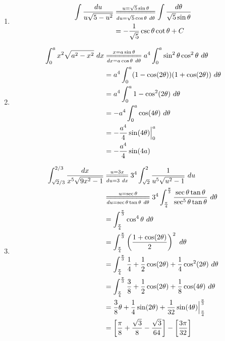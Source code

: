 \documentclass{article}
\begin{document}
\begin{enumerate}[label={\bf{}\arabic*}.]
\item%
	\begin{align*}
	\int\frac{du}{u\sqrt{5-u^2}}&\overset{u=\sqrt{5}\sin\theta}{\underset{du=\sqrt{5}\cos\theta\ d\theta}{=\joinrel=\joinrel=\joinrel=\joinrel=\joinrel=\joinrel=\joinrel=\joinrel=}}\int\frac{d\theta}{\sqrt{5}\sin\theta}\\
	&=-\frac{1}{\sqrt{5}}\csc\theta\cot\theta+C
	\end{align*}

\item%
	\begin{align*}
	\int_0^ax^2\sqrt{a^2-x^2}\ dx&\overset{x=a\sin\theta}{\underset{dx=a\cos\theta\ d\theta}{=\joinrel=\joinrel=\joinrel=\joinrel=\joinrel=\joinrel=\joinrel=}}a^4\int_0^a\sin^2\theta\cos^2\theta\ d\theta\\
	&=a^4\int_0^a(1-\cos(2\theta))(1+\cos(2\theta))\ d\theta\\
	&=a^4\int_0^a1-\cos^2(2\theta)\ d\theta\\
	&=-a^4\int_0^a\cos(4\theta)\ d\theta\\
	&=-\frac{a^4}{4}\sin(4\theta)\Big|_0^a\\
	&=-\frac{a^4}{4}\sin(4a)
	\end{align*}

\item%
	\begin{align*}
	\int_{\sqrt{2}/3}^{2/3}\frac{dx}{x^5\sqrt{9x^2-1}}&\overset{u=3x}{\underset{du=3\ dx}{=\joinrel=\joinrel=\joinrel=\joinrel=}}3^4\int_{\sqrt{2}}^2\frac{1}{u^5\sqrt{u^2-1}}\ du\\
	&\overset{u=\sec\theta}{\underset{du=\sec\theta\tan\theta\ d\theta}{=\joinrel=\joinrel=\joinrel=\joinrel=\joinrel=\joinrel=\joinrel=\joinrel=\joinrel=}}3^4\int_\frac{\pi}{4}^\frac{\pi}{3}\frac{\sec\theta\tan\theta}{\sec^5\theta\tan\theta}\ d\theta\\
	&=\int_\frac{\pi}{4}^\frac{\pi}{3}\cos^4\theta\ d\theta\\
	&=\int_\frac{\pi}{4}^\frac{\pi}{3}\left(\frac{1+\cos(2\theta)}{2}\right)^2\ d\theta\\
	&=\int_\frac{\pi}{4}^\frac{\pi}{3}\frac{1}{4}+\frac{1}{2}\cos(2\theta)+\frac{1}{4}\cos^2(2\theta)\ d\theta\\
	&=\int_\frac{\pi}{4}^\frac{\pi}{3}\frac{3}{8}+\frac{1}{2}\cos(2\theta)+\frac{1}{8}\cos(4\theta)\ d\theta\\
	&=\frac{3}{8}\theta+\frac{1}{4}\sin(2\theta)+\frac{1}{32}\sin(4\theta)\Big|_\frac{\pi}{4}^\frac{\pi}{3}\\
	&=\left[\frac{\pi}{8}+\frac{\sqrt{3}}{8}-\frac{\sqrt{3}}{64}\right]-\left[\frac{3\pi}{32}\right]
	\end{align*}


\end{enumerate}
\end{document}
